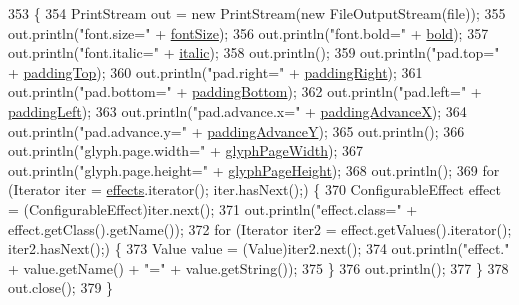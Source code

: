 \begin{DoxyCode}
353                                                    \{
354         PrintStream out = \textcolor{keyword}{new} PrintStream(\textcolor{keyword}{new} FileOutputStream(file));
355         out.println(\textcolor{stringliteral}{"font.size="} + \mbox{\hyperlink{classorg_1_1newdawn_1_1slick_1_1font_1_1_hiero_settings_a3e39f423902a5895bd26921a14fe1044}{fontSize}});
356         out.println(\textcolor{stringliteral}{"font.bold="} + \mbox{\hyperlink{classorg_1_1newdawn_1_1slick_1_1font_1_1_hiero_settings_a836242ef5a8edc24a2b5b8c85f9160eb}{bold}});
357         out.println(\textcolor{stringliteral}{"font.italic="} + \mbox{\hyperlink{classorg_1_1newdawn_1_1slick_1_1font_1_1_hiero_settings_a4e55c90c505a6a53fa3684288d379e6a}{italic}});
358         out.println();
359         out.println(\textcolor{stringliteral}{"pad.top="} + \mbox{\hyperlink{classorg_1_1newdawn_1_1slick_1_1font_1_1_hiero_settings_ad0793e48192b48898df4f3a31d4b3954}{paddingTop}});
360         out.println(\textcolor{stringliteral}{"pad.right="} + \mbox{\hyperlink{classorg_1_1newdawn_1_1slick_1_1font_1_1_hiero_settings_aca6e7bc5fddecfc1fe6fc94e864f05bc}{paddingRight}});
361         out.println(\textcolor{stringliteral}{"pad.bottom="} + \mbox{\hyperlink{classorg_1_1newdawn_1_1slick_1_1font_1_1_hiero_settings_a4ae9e95c341789431f72c0d7ad54b348}{paddingBottom}});
362         out.println(\textcolor{stringliteral}{"pad.left="} + \mbox{\hyperlink{classorg_1_1newdawn_1_1slick_1_1font_1_1_hiero_settings_ae145770ffd7fbe5fb0bc1e54be252734}{paddingLeft}});
363         out.println(\textcolor{stringliteral}{"pad.advance.x="} + \mbox{\hyperlink{classorg_1_1newdawn_1_1slick_1_1font_1_1_hiero_settings_a95bbfc376e37c8cbddb33d7e2fed2dd4}{paddingAdvanceX}});
364         out.println(\textcolor{stringliteral}{"pad.advance.y="} + \mbox{\hyperlink{classorg_1_1newdawn_1_1slick_1_1font_1_1_hiero_settings_a9ebcbca5bb87465cbb18bbc40b1bb09e}{paddingAdvanceY}});
365         out.println();
366         out.println(\textcolor{stringliteral}{"glyph.page.width="} + \mbox{\hyperlink{classorg_1_1newdawn_1_1slick_1_1font_1_1_hiero_settings_aeed4e1a4668cfa3c3dc94d481f68a5c3}{glyphPageWidth}});
367         out.println(\textcolor{stringliteral}{"glyph.page.height="} + \mbox{\hyperlink{classorg_1_1newdawn_1_1slick_1_1font_1_1_hiero_settings_a17c4e911610ef26561713830e4998cc1}{glyphPageHeight}});
368         out.println();
369         \textcolor{keywordflow}{for} (Iterator iter = \mbox{\hyperlink{classorg_1_1newdawn_1_1slick_1_1font_1_1_hiero_settings_ad1134cfcc8c0f5d582f8abe54d7eeb80}{effects}}.iterator(); iter.hasNext();) \{
370             ConfigurableEffect effect = (ConfigurableEffect)iter.next();
371             out.println(\textcolor{stringliteral}{"effect.class="} + effect.getClass().getName());
372             \textcolor{keywordflow}{for} (Iterator iter2 = effect.getValues().iterator(); iter2.hasNext();) \{
373                 Value value = (Value)iter2.next();
374                 out.println(\textcolor{stringliteral}{"effect."} + value.getName() + \textcolor{stringliteral}{"="} + value.getString());
375             \}
376             out.println();
377         \}
378         out.close();
379     \}
\end{DoxyCode}
